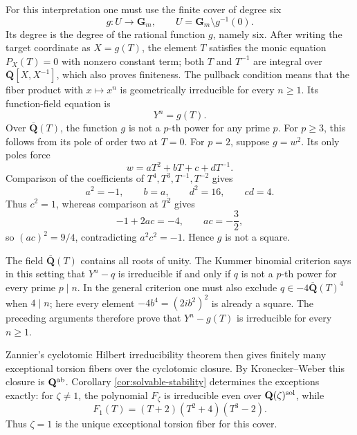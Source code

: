 For this interpretation one must use the finite cover of degree six
\[
 g:U\longrightarrow\mathbf G_m,
 \qquad U=\mathbf G_m\setminus g^{-1}(0).
\]
Its degree is the degree of the rational function $g$, namely six.
After writing the target coordinate as $X=g(T)$, the element $T$
satisfies the monic equation $P_X(T)=0$ with nonzero constant term;
both $T$ and $T^{-1}$ are integral over
$\overline{\mathbf Q}[X,X^{-1}]$, which also proves finiteness.  The
pullback condition means that the fiber product with $x\mapsto x^n$
is geometrically irreducible for every $n\ge1$.  Its function-field
equation is
\[
 Y^n=g(T).
\]
Over $\overline{\mathbf Q}(T)$, the function $g$ is not a $p$-th
power for any prime $p$.  For $p\ge3$, this follows from its pole of
order two at $T=0$.  For $p=2$, suppose $g=w^2$.  Its only poles force
\[
 w=aT^2+bT+c+dT^{-1}.
\]
Comparison of the coefficients of $T^4,T^3,T^{-1},T^{-2}$ gives
\[
 a^2=-1,\qquad b=a,\qquad d^2=16,\qquad cd=4.
\]
Thus $c^2=1$, whereas comparison at $T^2$ gives
\[
 -1+2ac=-4,
 \qquad ac=-\frac32,
\]
so $(ac)^2=9/4$, contradicting $a^2c^2=-1$.  Hence $g$ is not a
square.

The field $\overline{\mathbf Q}(T)$ contains all roots of unity.  The
Kummer binomial criterion
\cite[Chapter~VI, \S9, Theorem~9.1]{Lang2002} says in this setting that
$Y^n-q$ is irreducible if and only if $q$ is not a $p$-th power for
every prime $p\mid n$.  In the general criterion one must also exclude
$q\in-4\overline{\mathbf Q}(T)^4$ when $4\mid n$; here every element
$-4b^4=(2ib^2)^2$ is already a square.  The preceding arguments
therefore prove that $Y^n-g(T)$ is irreducible for every $n\ge1$.

Zannier's cyclotomic Hilbert irreducibility theorem
\cite[Theorem~2.1]{Zannier2010} then gives finitely many exceptional
torsion fibers over the cyclotomic closure.  By Kronecker--Weber this
closure is $\mathbf Q^{\mathrm{ab}}$.  Corollary
\ref{cor:solvable-stability} determines the exceptions exactly: for
$\zeta\ne1$, the polynomial $F_\zeta$ is irreducible even over
$\mathbf Q(\zeta)^{\mathrm{sol}}$, while
\[
 F_1(T)=(T+2)(T^2+4)(T^3-2).
\]
Thus $\zeta=1$ is the unique exceptional torsion fiber for this cover.
